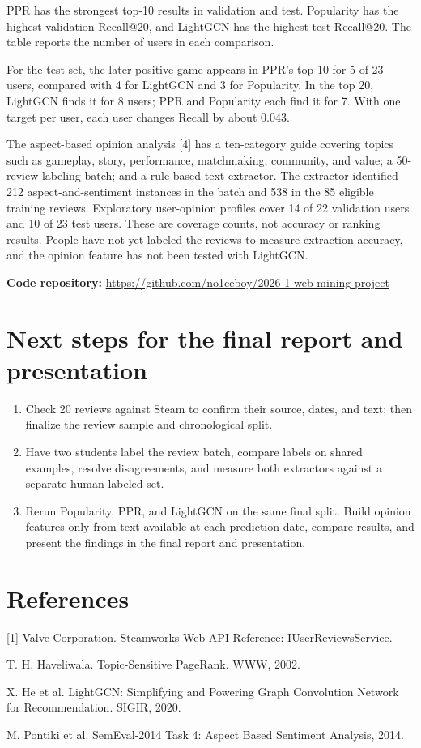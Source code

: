 \documentclass[11pt]{article}
\begin{document}
PPR has the strongest top-10 results in validation and test. Popularity has the highest validation Recall@20, and LightGCN has the highest test Recall@20. The table reports the number of users in each comparison.

For the test set, the later-positive game appears in PPR's top 10 for 5 of 23 users, compared with 4 for LightGCN and 3 for Popularity. In the top 20, LightGCN finds it for 8 users; PPR and Popularity each find it for 7. With one target per user, each user changes Recall by about 0.043.

The aspect-based opinion analysis [4] has a ten-category guide covering topics such as gameplay, story, performance, matchmaking, community, and value; a 50-review labeling batch; and a rule-based text extractor. The extractor identified 212 aspect-and-sentiment instances in the batch and 538 in the 85 eligible training reviews. Exploratory user-opinion profiles cover 14 of 22 validation users and 10 of 23 test users. These are coverage counts, not accuracy or ranking results. People have not yet labeled the reviews to measure extraction accuracy, and the opinion feature has not been tested with LightGCN.

\textbf{Code repository:} \url{https://github.com/no1ceboy/2026-1-web-mining-project}

\section*{Next steps for the final report and presentation}

\begin{enumerate}
  \item Check 20 reviews against Steam to confirm their source, dates, and text; then finalize the review sample and chronological split.
  \item Have two students label the review batch, compare labels on shared examples, resolve disagreements, and measure both extractors against a separate human-labeled set.
  \item Rerun Popularity, PPR, and LightGCN on the same final split. Build opinion features only from text available at each prediction date, compare results, and present the findings in the final report and presentation.
\end{enumerate}

\section*{References}
{\small
[1] Valve Corporation. Steamworks Web API Reference: IUserReviewsService.\par
[2] T. H. Haveliwala. Topic-Sensitive PageRank. WWW, 2002.\par
[3] X. He et al. LightGCN: Simplifying and Powering Graph Convolution Network for Recommendation. SIGIR, 2020.\par
[4] M. Pontiki et al. SemEval-2014 Task 4: Aspect Based Sentiment Analysis, 2014.
}
\end{document}
